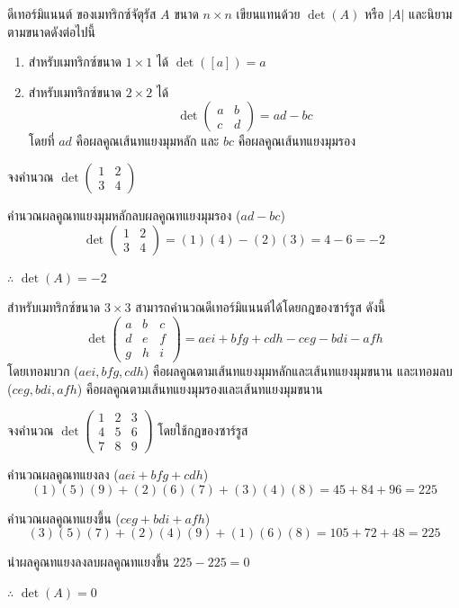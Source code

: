 \begin{definition}
ดีเทอร์มิแนนต์ ของเมทริกซ์จัตุรัส $A$ ขนาด $n \times n$ เขียนแทนด้วย $\det(A)$ หรือ $|A|$ และนิยามตามขนาดดังต่อไปนี้
\begin{enumerate}
  \item สำหรับเมทริกซ์ขนาด $1 \times 1$ ได้ $\det([a]) = a$
  \item สำหรับเมทริกซ์ขนาด $2 \times 2$ ได้
  \[
    \det\begin{pmatrix} a & b \\ c & d \end{pmatrix} = ad - bc
  \]
  โดยที่ $ad$ คือผลคูณเส้นทแยงมุมหลัก และ $bc$ คือผลคูณเส้นทแยงมุมรอง
\end{enumerate}
\end{definition}

\begin{ex}
\label{ex:det-2x2}
จงคำนวณ $\det\begin{pmatrix} 1 & 2 \\ 3 & 4 \end{pmatrix}$
\end{ex}
\begin{solution}
คำนวณผลคูณทแยงมุมหลักลบผลคูณทแยงมุมรอง ($ad - bc$) \[ \det\begin{pmatrix} 1 & 2 \\ 3 & 4 \end{pmatrix} = (1)(4) - (2)(3) = 4 - 6 = -2 \]

$\therefore$ $\det(A) = -2$ \solhere
\end{solution}

\begin{prop}
สำหรับเมทริกซ์ขนาด $3 \times 3$ สามารถคำนวณดีเทอร์มิแนนต์ได้โดยกฎของซาร์รูส ดังนี้
\[
\det\begin{pmatrix} a & b & c \\ d & e & f \\ g & h & i \end{pmatrix} = aei + bfg + cdh - ceg - bdi - afh
\]
โดยเทอมบวก ($aei, bfg, cdh$) คือผลคูณตามเส้นทแยงมุมหลักและเส้นทแยงมุมขนาน และเทอมลบ ($ceg, bdi, afh$) คือผลคูณตามเส้นทแยงมุมรองและเส้นทแยงมุมขนาน
\end{prop}

\begin{ex}
\label{ex:det-sarrus}
จงคำนวณ $\det\begin{pmatrix} 1 & 2 & 3 \\ 4 & 5 & 6 \\ 7 & 8 & 9 \end{pmatrix}$ โดยใช้กฎของซาร์รูส
\end{ex}
\begin{solution}
คำนวณผลคูณทแยงลง ($aei + bfg + cdh$) \[ (1)(5)(9) + (2)(6)(7) + (3)(4)(8) = 45 + 84 + 96 = 225 \]

คำนวณผลคูณทแยงขึ้น ($ceg + bdi + afh$) \[ (3)(5)(7) + (2)(4)(9) + (1)(6)(8) = 105 + 72 + 48 = 225 \]

นำผลคูณทแยงลงลบผลคูณทแยงขึ้น $225 - 225 = 0$

$\therefore$ $\det(A) = 0$ \solhere
\end{solution}

